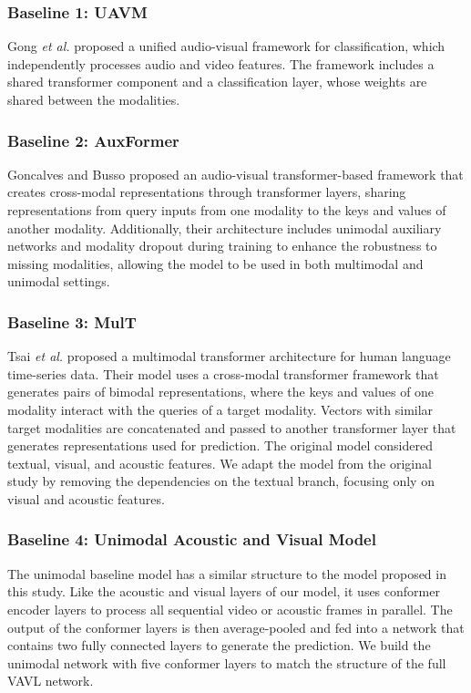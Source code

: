 \documentclass{article}
\def \etal {\textit{et al. }}
\begin{document}
\subsubsection{Baseline 1: UAVM}
Gong \etal \cite{gong_2022} proposed a unified audio-visual framework for classification, which independently processes audio and video features. The framework includes a shared transformer component and a classification layer, whose weights are shared between the modalities.

\subsubsection{Baseline 2: AuxFormer}
Goncalves and Busso \cite{Goncalves_2022} proposed an audio-visual transformer-based framework that creates cross-modal representations through transformer layers, sharing representations from query inputs from one modality to the keys and values of another modality. Additionally, their architecture includes unimodal auxiliary networks and modality dropout during training to enhance the robustness to missing modalities, allowing the model to be used in both multimodal and unimodal settings.

\subsubsection{Baseline 3: MulT}

Tsai \etal \cite{Tsai_2019} proposed a multimodal transformer architecture for human language time-series data. Their model uses a cross-modal transformer framework that generates pairs of bimodal representations, where the keys and values of one modality interact with the queries of a target modality. Vectors with similar target modalities are concatenated and passed to another transformer layer that generates representations used for prediction. The original model considered textual, visual, and acoustic features. We adapt the model from the original study by removing the dependencies on the textual branch, focusing only on visual and acoustic features. 

\subsubsection{Baseline 4: Unimodal Acoustic and Visual Model}
The unimodal baseline model has a similar structure to the model proposed in this study. Like the acoustic and visual layers of our model, it uses conformer encoder layers \cite{gulati_2020} to process all sequential video or acoustic frames in parallel. The output of the conformer layers is then average-pooled and fed into a network that contains two fully connected layers to generate the prediction. We build the unimodal network with five conformer layers to match the structure of the full VAVL network. 
\end{document}
